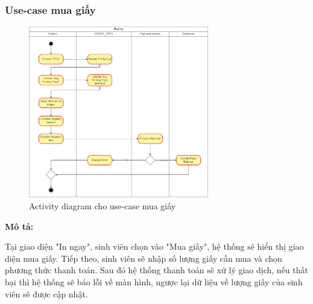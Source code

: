 \subsubsection{Use-case mua giấy}
\begin{figure}[H]
    \begin{center}
        \includegraphics[width=0.7\textwidth]{Images/System Modelling/Buying_Activity.png}
        \caption{Activity diagram cho use-case mua giấy}
    \end{center}
\end{figure}
\textbf{Mô tả: }\par
Tại giao diện "In ngay", sinh viên chọn vào "Mua giấy", hệ thống sẽ hiển thị giao diện mua giấy. Tiếp theo, sinh viên sẽ nhập số lượng giấy cần mua và chọn phương thức thanh toán. Sau đó hệ thống thanh toán sẽ xử lý giao dịch, nếu thất bại thì hệ thống sẽ báo lỗi về màn hình, ngược lại dữ liệu về lượng giấy của sinh viên sẽ được cập nhật.

